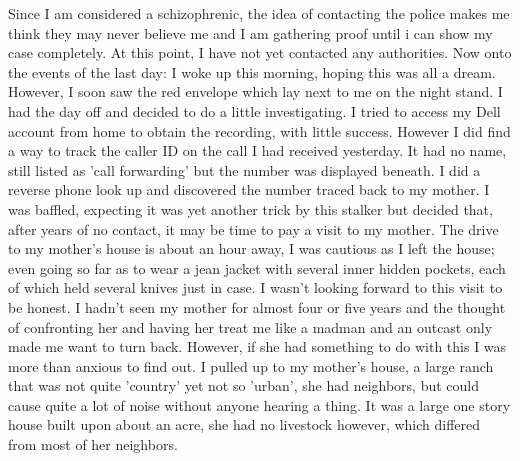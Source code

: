 \documentclass[a5paper]{scrartcl}
\begin{document}
Since I am considered a schizophrenic, the idea of contacting the police makes me think they may never believe me and I am gathering proof until i can show my case completely. At this point, I have not yet contacted any authorities. Now onto the events of the last day:
I woke up this morning, hoping this was all a dream. However, I soon saw the red envelope which lay next to me on the night stand. I had the day off and decided to do a little investigating. I tried to access my Dell account from home to obtain the recording, with little success. However I did find a way to track the caller ID on the call I had received yesterday. It had no name, still listed as 'call forwarding' but the number was displayed beneath. I did a reverse phone look up and discovered the number traced back to my mother. I was baffled, expecting it was yet another trick by this stalker but decided that, after years of no contact, it may be time to pay a visit to my mother.
The drive to my mother's house is about an hour away, I was cautious as I left the house; even going so far as to wear a jean jacket with several inner hidden pockets, each of which held several knives just in case. I wasn't looking forward to this visit to be honest. I hadn't seen my mother for almost four or five years and the thought of confronting her and having her treat me like a madman and an outcast only made me want to turn back. However, if she had something to do with this I was more than anxious to find out. I pulled up to my mother's house, a large ranch that was not quite 'country' yet not so 'urban', she had neighbors, but could cause quite a lot of noise without anyone hearing a thing. It was a large one story house built upon about an acre, she had no livestock however, which differed from most of her neighbors.\\
\end{document}
